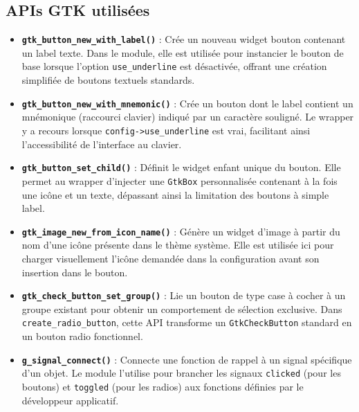 \subsection{APIs GTK utilisées}

\begin{itemize}
    \item \textbf{\texttt{gtk\_button\_new\_with\_label()}} : Crée un nouveau widget bouton contenant un label texte. Dans le module, elle est utilisée pour instancier le bouton de base lorsque l'option \texttt{use\_underline} est désactivée, offrant une création simplifiée de boutons textuels standards.
    \item \textbf{\texttt{gtk\_button\_new\_with\_mnemonic()}} : Crée un bouton dont le label contient un mnémonique (raccourci clavier) indiqué par un caractère souligné. Le wrapper y a recours lorsque \texttt{config->use\_underline} est vrai, facilitant ainsi l'accessibilité de l'interface au clavier.
    \item \textbf{\texttt{gtk\_button\_set\_child()}} : Définit le widget enfant unique du bouton. Elle permet au wrapper d'injecter une \texttt{GtkBox} personnalisée contenant à la fois une icône et un texte, dépassant ainsi la limitation des boutons à simple label.
    \item \textbf{\texttt{gtk\_image\_new\_from\_icon\_name()}} : Génère un widget d'image à partir du nom d'une icône présente dans le thème système. Elle est utilisée ici pour charger visuellement l'icône demandée dans la configuration avant son insertion dans le bouton.
    \item \textbf{\texttt{gtk\_check\_button\_set\_group()}} : Lie un bouton de type case à cocher à un groupe existant pour obtenir un comportement de sélection exclusive. Dans \texttt{create\_radio\_button}, cette API transforme un \texttt{GtkCheckButton} standard en un bouton radio fonctionnel.
    \item \textbf{\texttt{g\_signal\_connect()}} : Connecte une fonction de rappel à un signal spécifique d'un objet. Le module l'utilise pour brancher les signaux \texttt{clicked} (pour les boutons) et \texttt{toggled} (pour les radios) aux fonctions définies par le développeur applicatif.
\end{itemize}

\newpage
